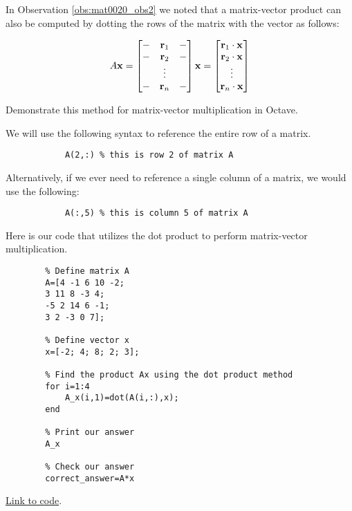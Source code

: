 \documentclass{ximera}
\begin{document}
\begin{example}\label{ex_oct_mat_prod_dot}
In Observation \ref{obs:mat0020_obs2} we noted that a matrix-vector product can also be computed by dotting the rows of the matrix with the vector as follows:

$$A\mathbf{x}=\begin{bmatrix}-&\mathbf{r}_1&-\\-&\mathbf{r}_2&-\\ &\vdots & \\-&\mathbf{r}_n &-\end{bmatrix}\mathbf{x}=\begin{bmatrix}\mathbf{r}_1\cdot\mathbf{x}\\\mathbf{r}_2\cdot\mathbf{x}\\\vdots\\\mathbf{r}_n\cdot\mathbf{x}\end{bmatrix}$$

Demonstrate this method for matrix-vector multiplication in Octave.
    \begin{explanation}
        We will use the following syntax to reference the entire row of a matrix.
        \begin{verbatim}
            A(2,:) % this is row 2 of matrix A
        \end{verbatim}
        Alternatively, if we ever need to reference a single column of a matrix, we would use the following:
        \begin{verbatim}
            A(:,5) % this is column 5 of matrix A
        \end{verbatim}

    Here is our code that utilizes the dot product to perform matrix-vector multiplication.

    \begin{verbatim}
        % Define matrix A 
        A=[4 -1 6 10 -2;  
        3 11 8 -3 4;  
        -5 2 14 6 -1;  
        3 2 -3 0 7];  
        
        % Define vector x  
        x=[-2; 4; 8; 2; 3];  
        
        % Find the product Ax using the dot product method
        for i=1:4  
            A_x(i,1)=dot(A(i,:),x);  
        end  
        
        % Print our answer  
        A_x  
        
        % Check our answer  
        correct_answer=A*x  
    \end{verbatim}

    \href{https://sagecell.sagemath.org/?z=eJxdj0FLAzEQhe-F_od3KXSlgWZ3raUlh6B49uKpSCmbqRukicxmNT_f2ahFDDnMvO_NG2aBBzr7QLicEvsMi_nMmkMLpbGBXkPVe4jWQGtsoRq0pVe3qKFb8Sj9Y6gnusbdS-nlL_A8ECtXFjh8UJciI080m8MULFnbPaRo_gw9-uCQesI7Rzd2CTZjHHx4LaKL6QoulPro5rOzxHqjd23JkGePeelXujLiXlopd9UqV2UFSfjvpif2ISGOjFMYPoknIKNXft9T9_aPd5FZDjl-K8be5C-N81KK&lang=octave&interacts=eJyLjgUAARUAuQ==}{Link to code}.
    \end{explanation}
\end{example}
\end{document}
